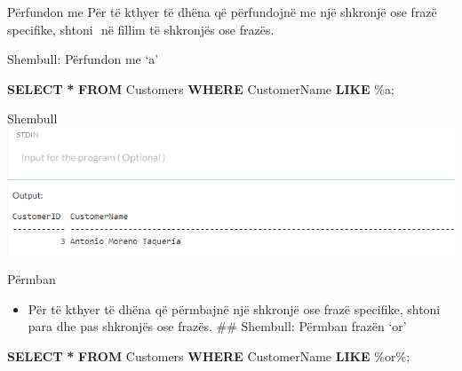 \documentclass[
  ignorenonframetext,
]{beamer}
\newenvironment{Shaded}{\begin{snugshade}}{\end{snugshade}}
\newcommand{\KeywordTok}[1]{\textcolor[rgb]{0.13,0.29,0.53}{\textbf{#1}}}
\newcommand{\NormalTok}[1]{#1}
\newcommand{\OperatorTok}[1]{\textcolor[rgb]{0.81,0.36,0.00}{\textbf{#1}}}
\newcommand{\StringTok}[1]{\textcolor[rgb]{0.31,0.60,0.02}{#1}}
\providecommand{\tightlist}{%
  \setlength{\itemsep}{0pt}\setlength{\parskip}{0pt}}
\begin{document}
\begin{frame}{Përfundon me}
\label{puxebrfundon-me}
Për të kthyer të dhëna që përfundojnë me një shkronjë ose frazë
specifike, shtoni \(%
\) në fillim të shkronjës ose frazës.
\end{frame}

\begin{frame}[fragile]{Shembull: Përfundon me `a'}
\label{shembull-puxebrfundon-me-a}
\begin{Shaded}
\begin{Highlighting}[]
\KeywordTok{SELECT} \OperatorTok{*}
\KeywordTok{FROM}\NormalTok{ Customers}
\KeywordTok{WHERE}\NormalTok{ CustomerName }\KeywordTok{LIKE} \StringTok{\textquotesingle{}\%a\textquotesingle{}}\NormalTok{;}
\end{Highlighting}
\end{Shaded}
\end{frame}

\begin{frame}{Shembull}
\label{shembull-8}
\includegraphics{./Figs/query64.png}
\end{frame}

\begin{frame}[fragile]{Përmban}
\label{puxebrmban}
\begin{itemize}
\tightlist
\item
  Për të kthyer të dhëna që përmbajnë një shkronjë ose frazë specifike,
  shtoni \(%
  \) para dhe pas shkronjës ose frazës. \#\# Shembull: Përmban frazën
  `or'
\end{itemize}

\begin{Shaded}
\begin{Highlighting}[]
\KeywordTok{SELECT} \OperatorTok{*}
\KeywordTok{FROM}\NormalTok{ Customers}
\KeywordTok{WHERE}\NormalTok{ CustomerName }\KeywordTok{LIKE} \StringTok{\textquotesingle{}\%or\%\textquotesingle{}}\NormalTok{;}
\end{Highlighting}
\end{Shaded}
\end{frame}
\end{document}
